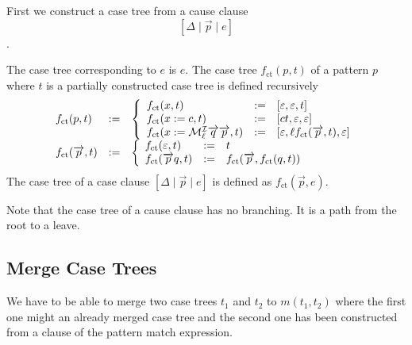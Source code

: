 First we construct a case tree from a cause clause
$$ [\Delta \mid \vec p \mid e] $$.

{
    \def\ct{f_\text{ct}}
    The case tree corresponding to $e$ is $e$. The case tree $\ct(p, t)$ of a
    pattern $p$ where $t$ is a partially constructed case tree is defined
    recursively
    $$
        \vertlist{
            \ct(p, t) &:= & \cases{
                \ct(x, t)      & := & [\empty, \empty, t]
                \\
                \ct(x := c, t) & := & [c t, \empty, \empty]
                \\
                \ct(x := \Make^\Ind_\ell \vec q \vec p, t)
                & :=
                & [\empty, \ell \ct(\vec p, t), \empty]
            }
            \\
            \ct(\vec p, t) &:= & \cases{
                \ct(\empty, t) &:=& t
                \\
                \ct(\vec p q, t) &:= & \ct(\vec p, \ct(q, t))
            }
        }
    $$
    The case tree of a case clause $[\Delta \mid \vec p \mid e]$ is defined as
    $\ct(\vec p, e)$.
}

Note that the case tree of a cause clause has no branching.
It is a path from the root to a leave.



\subsection{Merge Case Trees}

We have to be able to merge two case trees $t_1$
and $t_2$ to $m(t_1, t_2)$ where the first one might an already merged case tree
and the second one has been constructed from a clause of the pattern match
expression.

